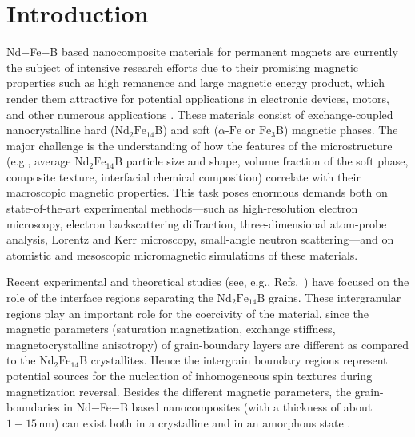 \documentclass[prm,twocolumn,showkeys,preprintnumbers,amsmath,amssymb,superscriptaddress,aps,10pt]{revtex4-1}
\begin{document}
\section{Introduction}

Nd$-$Fe$-$B based nanocomposite materials for permanent magnets are currently the subject of intensive research efforts due to their promising magnetic properties such as high remanence and large magnetic energy product, which render them attractive for potential applications in electronic devices, motors, and other numerous applications \cite{coehoorn88,Davies1989,gutfleisch2002,gutfleisch2011,liu2009,bance2014}. These materials consist of exchange-coupled nanocrystalline hard ($\mathrm{Nd}_2\mathrm{Fe}_{14}\mathrm{B}$) and soft ($\alpha$-$\mathrm{Fe}$ or $\mathrm{Fe}_3\mathrm{B}$) magnetic phases. The major challenge is the understanding of how the features of the microstructure (e.g., average $\mathrm{Nd}_2\mathrm{Fe}_{14}\mathrm{B}$ particle size and shape, volume fraction of the soft phase, composite texture, interfacial chemical composition) correlate with their macroscopic magnetic properties. This task poses enormous demands both on state-of-the-art experimental methods---such as high-resolution electron microscopy, electron backscattering diffraction, three-dimensional atom-probe analysis, Lorentz and Kerr microscopy, small-angle neutron scattering---and on atomistic and mesoscopic micromagnetic simulations of these materials.

Recent experimental and theoretical studies (see, e.g., Refs.~) have focused on the role of the interface regions separating the $\mathrm{Nd}_2\mathrm{Fe}_{14}\mathrm{B}$ grains. These intergranular regions play an important role for the coercivity of the material, since the magnetic parameters (saturation magnetization, exchange stiffness, magnetocrystalline anisotropy) of grain-boundary layers are different as compared to the $\mathrm{Nd}_2\mathrm{Fe}_{14}\mathrm{B}$ crystallites. Hence the intergrain boundary regions  represent potential sources for the nucleation of inhomogeneous spin textures during magnetization reversal. Besides the different magnetic parameters, the grain-boundaries in Nd$-$Fe$-$B based nanocomposites (with a thickness of about $1-15 \, \mathrm{nm}$) can exist both in a crystalline and in an amorphous state \cite{SepehriAmin2013}.
\end{document}
